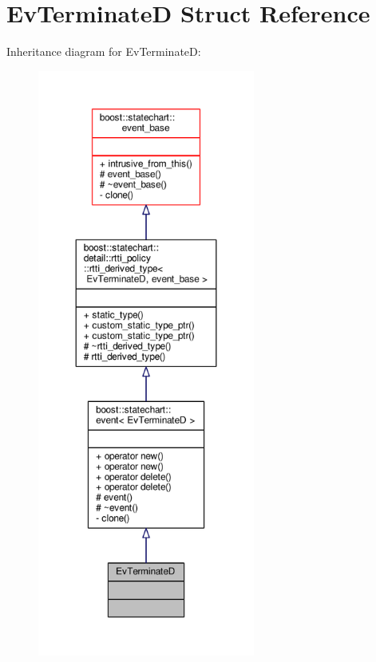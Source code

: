 \hypertarget{struct_ev_terminate_d}{}\section{Ev\+TerminateD Struct Reference}
\label{struct_ev_terminate_d}


Inheritance diagram for Ev\+TerminateD\+:
\nopagebreak
\begin{figure}[H]
\begin{center}
\leavevmode
\includegraphics[height=550pt]{struct_ev_terminate_d__inherit__graph}
\end{center}
\end{figure}


